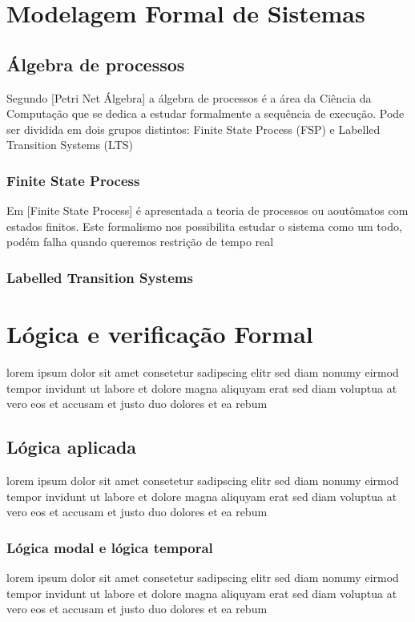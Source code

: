 \section{Modelagem Formal de Sistemas}
\subsection{Álgebra de processos}
Segundo [Petri Net Álgebra] a álgebra de processos é a área da Ciência da Computação que se dedica
a estudar formalmente a sequência de execução. Pode ser dividida em dois
grupos distintos: Finite State Process (FSP) e Labelled Transition Systems (LTS)
\subsubsection{Finite State Process}
Em [Finite State Process] é apresentada a teoria de processos ou aoutômatos com estados finitos.
Este formalismo nos possibilita estudar o sistema como um todo, podém falha quando queremos restrição de tempo real
\subsubsection{Labelled Transition Systems}
\section{Lógica e verificação Formal}
lorem ipsum dolor sit amet consetetur sadipscing elitr sed diam nonumy
eirmod tempor invidunt ut labore et dolore magna aliquyam erat sed diam
voluptua at vero eos et accusam et justo duo dolores et ea rebum


\subsection{Lógica aplicada}
lorem ipsum dolor sit amet consetetur sadipscing elitr sed diam nonumy
eirmod tempor invidunt ut labore et dolore magna aliquyam erat sed diam
voluptua at vero eos et accusam et justo duo dolores et ea rebum

\subsubsection{Lógica modal e lógica temporal}
lorem ipsum dolor sit amet consetetur sadipscing elitr sed diam nonumy
eirmod tempor invidunt ut labore et dolore magna aliquyam erat sed diam
voluptua at vero eos et accusam et justo duo dolores et ea rebum

